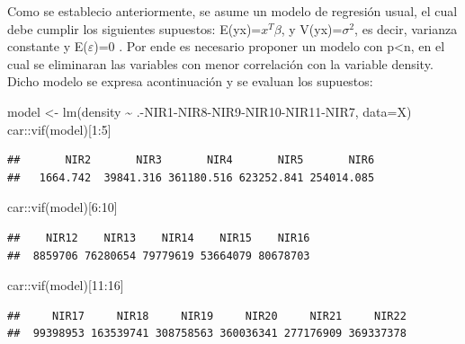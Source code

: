\documentclass[
]{article}
\newenvironment{Shaded}{\begin{snugshade}}{\end{snugshade}}
\newcommand{\AttributeTok}[1]{\textcolor[rgb]{0.77,0.63,0.00}{#1}}
\newcommand{\DecValTok}[1]{\textcolor[rgb]{0.00,0.00,0.81}{#1}}
\newcommand{\FunctionTok}[1]{\textcolor[rgb]{0.00,0.00,0.00}{#1}}
\newcommand{\NormalTok}[1]{#1}
\newcommand{\OtherTok}[1]{\textcolor[rgb]{0.56,0.35,0.01}{#1}}
\newcommand{\SpecialCharTok}[1]{\textcolor[rgb]{0.00,0.00,0.00}{#1}}
\begin{document}
Como se establecio anteriormente, se asume un modelo de regresión usual,
el cual debe cumplir los siguientes supuestos:
E(y\textbar x)=\(x^T\beta\), y V(y\textbar x)=\(\sigma^2\), es decir,
varianza constante y E(\(\varepsilon\))=0 . Por ende es necesario
proponer un modelo con p\textless n, en el cual se eliminaran las
variables con menor correlación con la variable density. Dicho modelo se
expresa acontinuación y se evaluan los supuestos:

\begin{Shaded}
\begin{Highlighting}[]
\NormalTok{model }\OtherTok{\textless{}{-}} \FunctionTok{lm}\NormalTok{(density }\SpecialCharTok{\textasciitilde{}}\NormalTok{ .}\SpecialCharTok{{-}}\NormalTok{NIR1}\SpecialCharTok{{-}}\NormalTok{NIR8}\SpecialCharTok{{-}}\NormalTok{NIR9}\SpecialCharTok{{-}}\NormalTok{NIR10}\SpecialCharTok{{-}}\NormalTok{NIR11}\SpecialCharTok{{-}}\NormalTok{NIR7, }\AttributeTok{data=}\NormalTok{X)}
\NormalTok{car}\SpecialCharTok{::}\FunctionTok{vif}\NormalTok{(model)[}\DecValTok{1}\SpecialCharTok{:}\DecValTok{5}\NormalTok{]}
\end{Highlighting}
\end{Shaded}

\begin{verbatim}
##       NIR2       NIR3       NIR4       NIR5       NIR6 
##   1664.742  39841.316 361180.516 623252.841 254014.085
\end{verbatim}

\begin{Shaded}
\begin{Highlighting}[]
\NormalTok{car}\SpecialCharTok{::}\FunctionTok{vif}\NormalTok{(model)[}\DecValTok{6}\SpecialCharTok{:}\DecValTok{10}\NormalTok{]}
\end{Highlighting}
\end{Shaded}

\begin{verbatim}
##    NIR12    NIR13    NIR14    NIR15    NIR16 
##  8859706 76280654 79779619 53664079 80678703
\end{verbatim}

\begin{Shaded}
\begin{Highlighting}[]
\NormalTok{car}\SpecialCharTok{::}\FunctionTok{vif}\NormalTok{(model)[}\DecValTok{11}\SpecialCharTok{:}\DecValTok{16}\NormalTok{]}
\end{Highlighting}
\end{Shaded}

\begin{verbatim}
##     NIR17     NIR18     NIR19     NIR20     NIR21     NIR22 
##  99398953 163539741 308758563 360036341 277176909 369337378
\end{verbatim}
\end{document}
